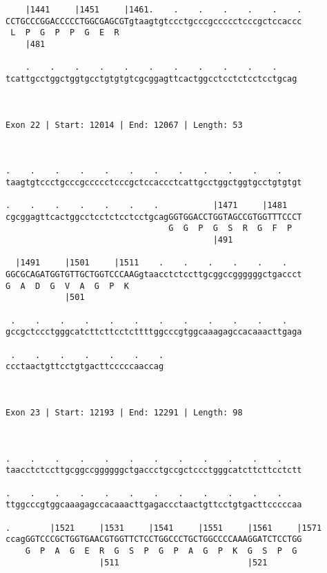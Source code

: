 \documentclass{article}
\begin{document}
\begin{Verbatim}
    |1441     |1451     |1461.    .    .    .    .    .    .
CCTGCCCGGACCCCCTGGCGAGCGTgtaagtgtccctgcccgccccctcccgctccaccc
 L  P  G  P  P  G  E  R                                     
    |481                                                    
  
    .    .    .    .    .    .    .    .    .    .    .    
tcattgcctggctggtgcctgtgtgtcgcggagttcactggcctcctctcctcctgcag
                                                           
                                                           
 
Exon 22 | Start: 12014 | End: 12067 | Length: 53



.    .    .    .    .    .    .    .    .    .    .    .    
taagtgtccctgcccgccccctcccgctccaccctcattgcctggctggtgcctgtgtgt
                                                            
.    .    .    .    .    .    .           |1471     |1481   
cgcggagttcactggcctcctctcctcctgcagGGTGGACCTGGTAGCCGTGGTTTCCCT
                                 G  G  P  G  S  R  G  F  P  
                                          |491              
  
  |1491     |1501     |1511    .    .    .    .    .    .   
GGCGCAGATGGTGTTGCTGGTCCCAAGgtaacctctccttgcggccggggggctgaccct
G  A  D  G  V  A  G  P  K                                   
            |501                                            
  
 .    .    .    .    .    .    .    .    .    .    .    .   
gccgctccctgggcatcttcttcctcttttggcccgtggcaaagagccacaaacttgaga
                                                            
 .    .    .    .    .    .    .
ccctaactgttcctgtgacttcccccaaccag
                                
                                
 
Exon 23 | Start: 12193 | End: 12291 | Length: 98



.    .    .    .    .    .    .    .    .    .    .    .    
taacctctccttgcggccggggggctgaccctgccgctccctgggcatcttcttcctctt
                                                            
.    .    .    .    .    .    .    .    .    .    .    .    
ttggcccgtggcaaagagccacaaacttgagaccctaactgttcctgtgacttcccccaa
                                                            
.        |1521     |1531     |1541     |1551     |1561     |1571
ccagGGTCCCGCTGGTGAACGTGGTTCTCCTGGCCCTGCTGGCCCCAAAGGATCTCCTGG
    G  P  A  G  E  R  G  S  P  G  P  A  G  P  K  G  S  P  G 
                   |511                          |521       
  

\end{Verbatim}
\end{document}
